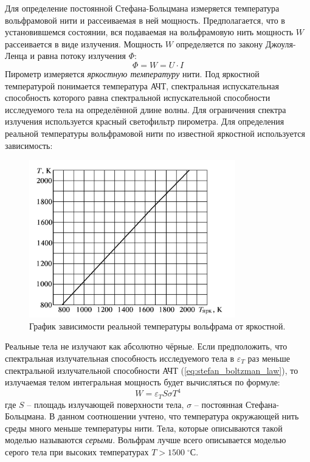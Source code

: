 \documentclass[10pt,a4paper]{article}
\newcommand{\cels}{\; ^\circ С}
\begin{document}
\begin{multicols}{2}
	Для определение постоянной Стефана-Больцмана измеряется температура вольфрамовой нити и рассеиваемая в ней мощность. Предполагается, что в установившемся состоянии, вся подаваемая на вольфрамовую нить мощность $W$ рассеивается в виде излучения. Мощность $W$ определяется по закону Джоуля-Ленца и равна потоку излучения $\Phi$:
	$$
	\Phi = W = U \cdot I
	$$
	Пирометр измеряется \textit{яркостную температуру} нити. Под яркостной температурой понимается температура АЧТ, спектральная испускательная способность которого равна спектральной испускательной способности исследуемого тела на определённой длине волны. Для ограничения спектра излучения используется красный светофильтр пирометра. Для определения реальной температуры вольфрамовой нити по известной яркостной используется зависимость:
	
	\begin{figure}[H]
		\centering
		\includegraphics[width=0.8\textwidth]{images/wolfram_real_temp_brigh_temp.png}
		\caption{График зависимости реальной температуры вольфрама от яркостной.}
		\label{img:wolfram_real_temp_brigh_temp}
	\end{figure}
	
	Реальные тела не излучают как абсолютно чёрные. Если предположить, что спектральная излучательная способность исследуемого тела в $\varepsilon_T$ раз меньше спектральной излучательной способности АЧТ (\ref{eq:stefan_boltzman_law}), то излучаемая телом интегральная мощность будет вычисляться по формуле:
	\begin{equation}
		W = \varepsilon_T S \sigma T^4
		\label{eq:grey_stefan_boltzmann}
	\end{equation}
	где $S$ -- площадь излучающей поверхности тела, $\sigma$ -- постоянная Стефана-Больцмана. В данном соотношении учтено, что температура окружающей нить среды много меньше температуры нити. Тела, которые описываются такой моделью называются \textit{серыми}. Вольфрам лучше всего описывается моделью серого тела при высоких температурах $T > 1500 \cels$. 
	

\end{multicols}
\end{document}
